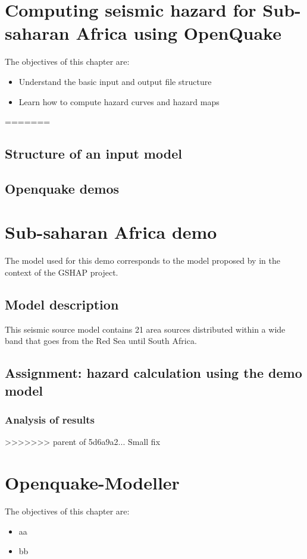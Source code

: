 \documentclass[11pt,a4paper,headings=small,dvips]{scrbook}
\newenvironment{myfancybox}{%
  \def\FrameCommand{\fboxsep=\FrameSep \fcolorbox{blue01}{honeydew}}%
  \color{black}\MakeFramed {\FrameRestore}}%
 {\endMakeFramed}
\begin{document}
\chapter{Computing seismic hazard for Sub-saharan Africa using OpenQuake}
\begin{myfancybox}
The objectives of this chapter are:
\begin{itemize}
    \item Understand the basic input and output file structure
    \item Learn how to compute hazard curves and hazard maps
\end{itemize}
\end{myfancybox}
    
=======
\section{Structure of an input model}
\section{Openquake demos}
\cleardoublepage
\chapter{Sub-saharan Africa demo}
The model used for this demo corresponds to the model proposed by 
\citet{midzi1999} in the context of the GSHAP project.
\section{Model description}
This seismic source model contains 21 area sources distributed within a wide 
band that goes from the Red Sea until South Africa.
\section{Assignment: hazard calculation using the demo model}
\subsection{Analysis of results}
\cleardoublepage
>>>>>>> parent of 5d6a9a2... Small fix
\chapter{Openquake-Modeller}
\begin{myfancybox}
The objectives of this chapter are:
\begin{itemize}
    \item aa
    \item bb
\end{itemize}
\end{myfancybox}
  
\cleardoublepage
\end{document}
